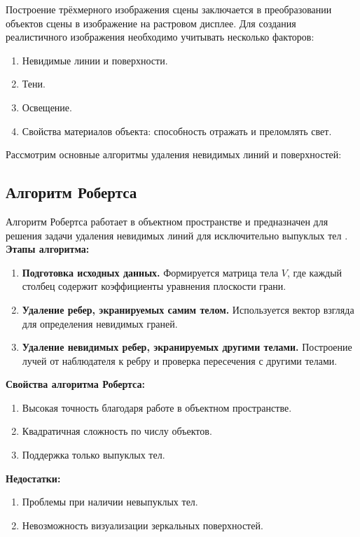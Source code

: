 Построение трёхмерного изображения сцены заключается в преобразовании объектов сцены в изображение на растровом дисплее. Для создания реалистичного изображения необходимо учитывать несколько факторов:

\begin{enumerate}[label=\arabic*)]
	\item Невидимые линии и поверхности.
	\item Тени.
	\item Освещение.
	\item Свойства материалов объекта: способность отражать и преломлять свет.
\end{enumerate}

Рассмотрим основные алгоритмы удаления невидимых линий и поверхностей:

\subsection{Алгоритм Робертса}

Алгоритм Робертса работает в объектном пространстве и предназначен для решения задачи удаления невидимых линий для исключительно выпуклых тел \cite{rogers, rogers_book}.
\textbf{Этапы алгоритма:}


\begin{enumerate}[label=\arabic*)]
	\item \textbf{Подготовка исходных данных.} Формируется матрица тела $V$, где каждый столбец содержит коэффициенты уравнения плоскости грани.
	\item \textbf{Удаление ребер, экранируемых самим телом.} Используется вектор взгляда для определения невидимых граней.
	\item \textbf{Удаление невидимых ребер, экранируемых другими телами.} Построение лучей от наблюдателя к ребру и проверка пересечения с другими телами.
\end{enumerate}

\textbf{Свойства алгоритма Робертса:}
\begin{enumerate}[label=\arabic*)]
	\item Высокая точность благодаря работе в объектном пространстве.
	\item Квадратичная сложность по числу объектов.
	\item Поддержка только выпуклых тел.
\end{enumerate}

\textbf{Недостатки:}
\begin{enumerate}[label=\arabic*)]
	\item Проблемы при наличии невыпуклых тел.
	\item Невозможность визуализации зеркальных поверхностей.
\end{enumerate}

